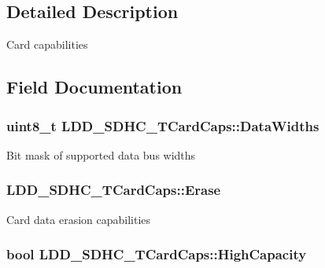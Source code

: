 \subsection{Detailed Description}
Card capabilities 

\subsection{Field Documentation}
\hypertarget{struct_l_d_d___s_d_h_c___t_card_caps_a79fc1f5a77986075f37dfc967fc7e839}{
\subsubsection[{Data\-Widths}]{\setlength{\rightskip}{0pt plus 5cm}uint8\-\_\-t L\-D\-D\-\_\-\-S\-D\-H\-C\-\_\-\-T\-Card\-Caps\-::\-Data\-Widths}}\label{struct_l_d_d___s_d_h_c___t_card_caps_a79fc1f5a77986075f37dfc967fc7e839}
Bit mask of supported data bus widths \hypertarget{struct_l_d_d___s_d_h_c___t_card_caps_afc5bbe5bce7267f930d6e8501ac5d2ea}{
\subsubsection[{Erase}]{ L\-D\-D\-\_\-\-S\-D\-H\-C\-\_\-\-T\-Card\-Caps\-::\-Erase}}\label{struct_l_d_d___s_d_h_c___t_card_caps_afc5bbe5bce7267f930d6e8501ac5d2ea}
Card data erasion capabilities \hypertarget{struct_l_d_d___s_d_h_c___t_card_caps_aecde13a16eb437017641776270f9479c}{
\subsubsection[{High\-Capacity}]{\setlength{\rightskip}{0pt plus 5cm}bool L\-D\-D\-\_\-\-S\-D\-H\-C\-\_\-\-T\-Card\-Caps\-::\-High\-Capacity}}\label{struct_l_d_d___s_d_h_c___t_card_caps_aecde13a16eb437017641776270f9479c}
